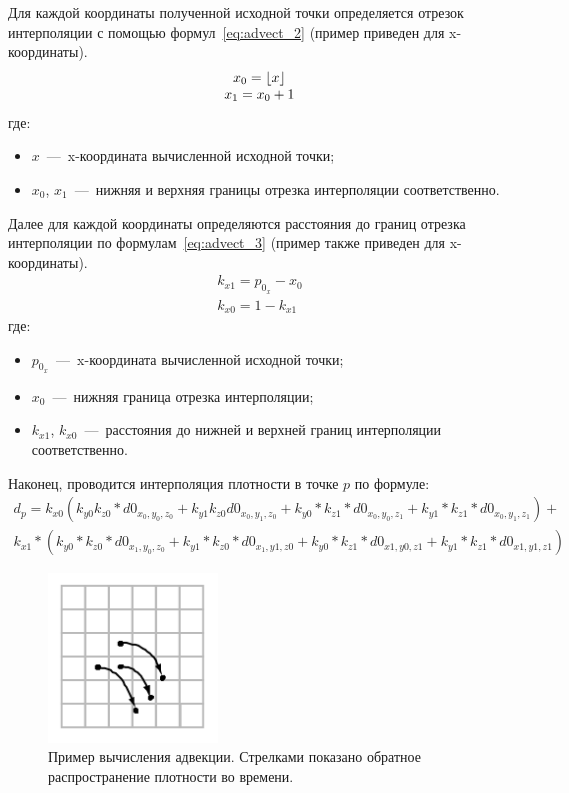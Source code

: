 Для каждой координаты полученной исходной точки определяется отрезок интерполяции с помощью формул~\ref{eq:advect_2} (пример приведен для x-координаты). 
\begin{equation}
	\label{eq:advect_2}
	\begin{matrix}
		x_0 = \lfloor x \rfloor \\
		x_1 = x_0 + 1
	\end{matrix}
\end{equation}
где:
\begin{itemize}
	\item $x$~---~x-координата вычисленной исходной точки;
	\item $x_0$, $x_1$~---~нижняя и верхняя границы отрезка интерполяции соответственно.
\end{itemize}

Далее для каждой координаты определяются расстояния до границ отрезка интерполяции по формулам~\ref{eq:advect_3} (пример также приведен для x-координаты).
\begin{equation}
	\label{eq:advect_3}
	\begin{matrix}
		k_{x1} = p_{0_x} - x_0 \\
		k_{x0} = 1 - k_{x1}
	\end{matrix}
\end{equation}
где:
\begin{itemize}
	\item $p_{0_x}$~---~x-координата вычисленной исходной точки;
	\item $x_0$~---~нижняя граница отрезка интерполяции;
	\item $k_{x1}$, $k_{x0}$~---~расстояния до нижней и верхней границ интерполяции соответственно.
\end{itemize}

Наконец, проводится интерполяция плотности в точке $p$ по формуле:
\begin{multline}
	\label{eq:advect4}
	d_p = k_{x0} (k_{y0} k_{z0} * d0_{x_0, y_0, z_0} + k_{y1} k_{z0} d0_{x_0, y_1, z_0} + k_{y0} * k_{z1} * d0_{x_0, y_0, z_1} +
	k_{y1} * k_{z1} * d0_{x_0, y_1, z_1}) + \\
	k_{x1} * (k_{y0} * k_{z0} * d0_{x_1, y_0, z_0} + k_{y1} * k_{z0} * d0_{x_1, y1, z0} + k_{y0} * k_{z1} * d0_{x1, y0, z1} + k_{y1} * k_{z1} * d0_{x1, y1, z1})
\end{multline}

\begin{figure}[H]
	\centering
	\includegraphics[width=0.4\textwidth,page=1]{assets/img/advect.png}
	\caption{Пример вычисления адвекции. Стрелками показано обратное распространение плотности во времени.}
	\label{fig:advect_idea}
\end{figure}

